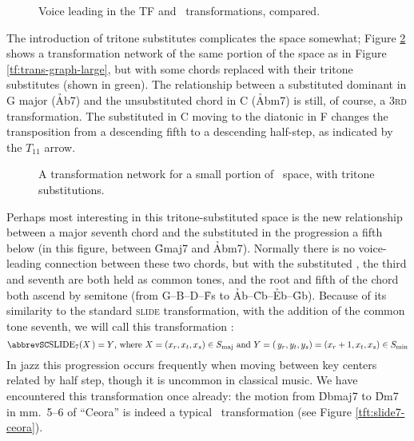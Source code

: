 \begin{figure}[htbp]
  \caption{Voice leading in the TF and \tft\ transformations, compared.}
  \label{tft:voice-leading-tft}
\end{figure}

The introduction of tritone substitutes complicates the space somewhat; Figure
\ref{tft:tft-space-extract} shows a transformation network of the same portion
of the space as in Figure \ref{tf:trans-graph-large}, but with some chords
replaced with their tritone substitutes (shown in green). The relationship
between a substituted dominant in G major (\h{Ab7}) and the unsubstituted \ii
chord in C (\h{Abm7}) is still, of course, a \textsc{3rd} transformation. The
substituted \V in C moving to the diatonic \V in F changes the
transposition from a descending fifth to a descending half-step, as indicated
by the $T_{11}$ arrow.

\begin{figure}[tbp]
  \caption{A transformation network for a small portion of \tf\ space, with
    tritone substitutions.}
  \label{tft:tft-space-extract}
\end{figure}

Perhaps most interesting in this tritone-substituted space is the new
relationship between a major seventh chord and the substituted \ii in
the progression a fifth below (in this figure, between \h{Gmaj7} and \h{Abm7}).
Normally there is no voice-leading connection between these two chords, but
with the substituted \ii, the third and seventh are both held as common
tones, and the root and fifth of the chord both ascend by semitone (from
G--B--D--\h{Fs} to \h{Ab}--\h{Cb}--\h{Eb}--\h{Gb}). Because of its
similarity to the standard \textsc{slide} transformation, with the addition of
the common tone seventh, we will call this transformation \slideS:
%
{\novspace%
\begin{displaymath}
    \text{\slideS}(X\,) = Y\text{, where}\ X = (x_r, x_t, x_s) \in \Smaj
     \text{ and}\
    Y = (\,y_r, y_t, y_s) = (x_r + 1, x_t, x_s) \in \Smin
\end{displaymath}}%
%
In jazz this progression occurs frequently when moving between key
centers related by half step, though it is uncommon in classical
music.\fn{tft-4} We have encountered this transformation once already: the
motion from \h{Dbmaj7} to \h{Dm7} in mm.~5--6 of ``Ceora'' is indeed a typical
\slideS\ transformation (see Figure \ref{tft:slide7-ceora}).

